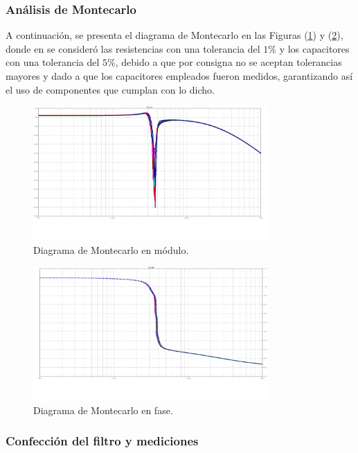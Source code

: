 \subsubsection{Análisis de Montecarlo}
A continuación, se presenta el diagrama de Montecarlo en las Figuras (\ref{fig:mc-mod}) y (\ref{fig:mc-pha}), donde en se consideró las resistencias con una tolerancia del $1\%$ y los capacitores con una tolerancia del $5\%$, debido a que por consigna no se aceptan tolerancias mayores y dado a que los capacitores empleados fueron medidos, garantizando así el uso de componentes que cumplan con lo dicho.
\begin{figure}[H]
\centering
	\includegraphics[width=0.8\textwidth,trim={0 3.5cm 1.5cm 0},clip]{ImagenesEjercicio4/MC-Mod-4.png}
	\caption{Diagrama de Montecarlo en módulo.}
	\label{fig:mc-mod}
\end{figure}
\begin{figure}[H]
\centering
	\includegraphics[width=0.8\textwidth,trim={1.25cm 3.5cm 0 0},clip]{ImagenesEjercicio4/MC-Pha-4.png}
	\caption{Diagrama de Montecarlo en fase.}
	\label{fig:mc-pha}
\end{figure}

\subsubsection{Confección del filtro y mediciones}

